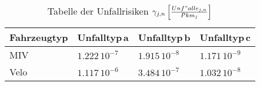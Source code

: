 %
%
%
%

\begin{table}[h!]
\flushleft
\renewcommand{\arraystretch}{1.4} 

%

\begin{tabular}{@{}p{2.6cm} p{3.3cm} p{3.3cm} p{2.8cm}@{}} \\   
\toprule
\textbf{Fahrzeugtyp} & \textbf{Unfalltyp\,a} & \textbf{Unfalltyp\,b} & \textbf{Unfalltyp\,c} \\
\midrule
MIV      & \(1.222\,\mathrm{10^{-7}}\)  & \(1.915\,\mathrm{10^{-8}}\)  & \(1.171\,\mathrm{10^{-9}}\)  \\
Velo	 & \(1.117\,\mathrm{10^{-6}}\)  & \(3.484\,\mathrm{10^{-7}}\)  & \(1.032\,\mathrm{10^{-8}}\)   \\

\bottomrule

\end{tabular}
\caption[Tabelle der Unfallrisiken]{Tabelle der Unfallrisiken $\gamma_{j,n}\,\Bigl[\frac{Unf"alle_{j,n}}{Pkm_{j}}\Bigl]$}
\label{tab:t-06-01-Unfallrisiko}
\end{table}


%


